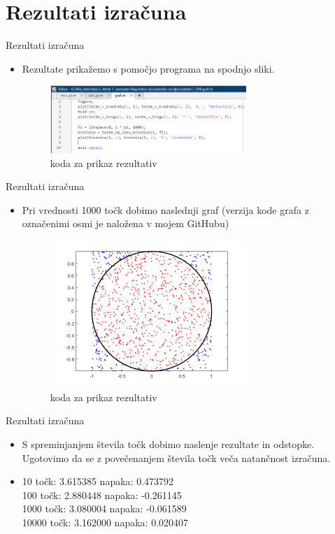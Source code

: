 \documentclass{beamer}
\begin{document}
\section{Rezultati izračuna}
\begin{frame}{Rezultati izračuna}
    \begin{itemize}
        \item Rezultate prikažemo s pomočjo programa na spodnjo sliki.
    \begin{figure}
        \includegraphics[width=0.7\textwidth]{Posnetek zaslona 2023-10-22 171843.png}
        \caption{koda za prikaz rezultativ}
    \end{figure}
    \end{itemize}
\end{frame}
\begin{frame}{Rezultati izračuna}
    \begin{itemize}
        \item Pri vrednosti 1000 točk dobimo naslednji graf (verzija kode grafa z označenimi osmi je naložena v mojem GitHubu)
    \begin{figure}
        \includegraphics[width=0.7\textwidth]{123.png}
        \caption{koda za prikaz rezultativ}
    \end{figure}
    \end{itemize}
\end{frame}
\begin{frame}{Rezultati izračuna}
    \begin{itemize}
        \item S spreminjanjem števila točk dobimo naslenje rezultate in odstopke. Ugotovimo da se z povečenanjem števila točk veča natančnost izračuna. 
        \pause
        \item 10 točk: 3.615385 napaka: 0.473792 \\100 točk: 2.880448 napaka: -0.261145 \\1000 točk: 3.080004 napaka: -0.061589\\ 10000 točk: 3.162000 napaka: 0.020407
    \end{itemize}
\end{frame}
\end{document}
